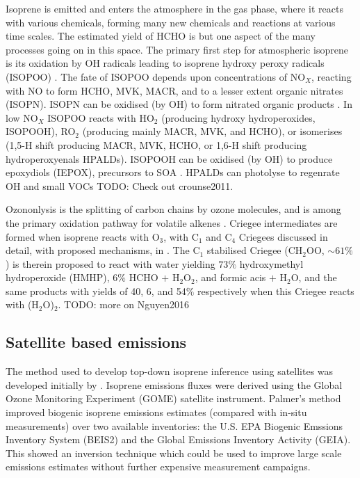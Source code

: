     Isoprene is emitted and enters the atmosphere in the gas phase, where it reacts with various chemicals, forming many new chemicals and reactions at various time scales.
    The estimated yield of HCHO is but one aspect of the many processes going on in this space.
    The primary first step for atmospheric isoprene is its oxidation by OH radicals leading to isoprene hydroxy peroxy radicals (ISOPOO) \citep{Wolfe2016,Marvin2017}.
    The fate of ISOPOO depends upon concentrations of NO$_X$, reacting with NO to form HCHO, MVK, MACR, and to a lesser extent organic nitrates (ISOPN).
    ISOPN can be oxidised (by OH) to form nitrated organic products \citep{Paulot2009a}.
    In low NO$_X$ ISOPOO reacts with HO$_2$ (producing hydroxy hydroperoxides, ISOPOOH), RO$_2$ (producing mainly MACR, MVK, and HCHO), or isomerises (1,5-H shift producing MACR, MVK, HCHO, or 1,6-H shift producing hydroperoxyenals HPALDs). 
    ISOPOOH can be oxidised (by OH) to produce epoxydiols (IEPOX), precursors to SOA \citep{Paulot2009b}. 
    HPALDs can photolyse to regenrate OH and small VOCs \citep{Crounse2011,Wolfe2012, Peeters2014} TODO: Check out crounse2011.
    
    Ozononlysis is the splitting of carbon chains by ozone molecules, and is among the primary oxidation pathway for volatile alkenes \citep{Nguyen2016}.
    Criegee intermediates are formed when isoprene reacts with O$_3$, with C$_1$ and C$_4$ Criegees discussed in detail, with proposed mechanisms, in \cite{Nguyen2016}.
    The C$_1$ stabilised Criegee (CH$_2$OO, $\sim 61\%$) is therein proposed to react with water yielding $73\%$ hydroxymethyl hydroperoxide (HMHP), $6\%$ HCHO $+$ H$_2$O$_2$, and formic acis $+$ H$_2$O, and the same products with yields of 40, 6, and 54$\%$ respectively when this Criegee reacts with (H$_2$O)$_2$.
    TODO: more on Nguyen2016
    
    
  \subsection{Satellite based emissions}
    The method used to develop top-down isoprene inference using satellites was developed initially by \citet{Palmer2001, Palmer2003}. 
    Isoprene emissions fluxes were derived using the Global Ozone Monitoring Experiment (GOME) satellite instrument.
    Palmer's method improved biogenic isoprene emissions estimates (compared with in-situ measurements) over two available inventories: the U.S. EPA Biogenic Emssions Inventory System (BEIS2) and the Global Emissions Inventory Activity (GEIA).
    This showed an inversion technique which could be used to improve large scale emissions estimates without further expensive measurement campaigns.
    
